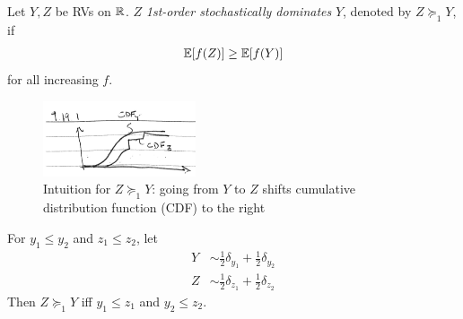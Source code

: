 \begin{definition}
  Let $Y, Z$ be RVs on $\mathbb{R}$.
  $Z$ \emph{1st-order stochastically dominates} $Y$,
  denoted by $Z \succeq_1 Y$, if
  \begin{align}
    \mathbb{E}[f(Z)] \geq \mathbb{E}[f(Y)]
  \end{align}
  for all increasing $f$.

  \begin{figure}[H]
    \begin{center}
      \includegraphics[width=0.4\textwidth]{figures/9-19-1.png}
    \end{center}
    \caption{Intuition for $Z \succeq_1 Y$: going from $Y$ to $Z$ shifts
    cumulative distribution function (CDF) to the right}
  \end{figure}
\end{definition}

\begin{lemma}
  For $y_1 \leq y_2$ and $z_1 \leq z_2$, let
  \begin{align}
    Y &\sim \frac{1}{2} \delta_{y_1} + \frac{1}{2} \delta_{y_2} \\
    Z &\sim \frac{1}{2} \delta_{z_1} + \frac{1}{2} \delta_{z_2}
  \end{align}
  Then $Z \succeq_1 Y$ iff $y_1 \leq z_1$
  and $y_2 \leq z_2$.
\end{lemma}

